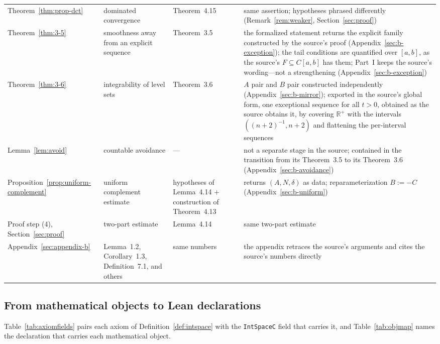 \documentclass[11pt]{article}
\theoremstyle{definition}
\theoremstyle{remark}
\begin{document}
\begin{table}[htbp]
\begin{tabular}{p{}p{}p{}p{}}
Theorem~\ref{thm:prop-dct} & dominated convergence & Theorem~4.15 & same assertion; hypotheses phrased differently (Remark~\ref{rem:weaker}, Section~\ref{sec:proof}) \\
Theorem~\ref{thm:3-5} & smoothness away from an explicit sequence & Theorem~3.5 & the formalized statement returns the explicit family constructed by the source's proof (Appendix~\ref{sec:b-exception}); the tail conditions are quantified over $[a,b]$, as the source's $F\subseteq C[a,b]$ has them; Part~I keeps the source's wording---not a strengthening (Appendix~\ref{sec:b-exception}) \\
Theorem~\ref{thm:3-6} & integrability of level sets & Theorem~3.6 & $A$ pair and $B$ pair constructed independently (Appendix~\ref{sec:b-mirror}); exported in the source's global form, one exceptional sequence for all $t>0$, obtained as the source obtains it, by covering $\mathbb{R}^{+}$ with the intervals $((n{+}2)^{-1},n{+}2)$ and flattening the per-interval sequences \\
Lemma~\ref{lem:avoid} & countable avoidance & --- & not a separate stage in the source; contained in the transition from its Theorem~3.5 to its Theorem~3.6 (Appendix~\ref{sec:b-avoidance}) \\
Proposition~\ref{prop:uniform-complement} & uniform complement estimate & hypotheses of Lemma~4.14 $+$ construction of Theorem~4.13 & returns $(A,N,\delta)$ as data; reparameterization $B:=-C$ (Appendix~\ref{sec:b-uniform}) \\
Proof step (4), Section~\ref{sec:proof} & two-part estimate & Lemma~4.14 & same two-part estimate \\
Appendix~\ref{sec:appendix-b} & Lemma~1.2, Corollary~1.3, Definition~7.1, and others & same numbers & the appendix retraces the source's arguments and cites the source's numbers directly \\
\hline
\end{tabular}
\end{table}

\subsection{From mathematical objects to Lean declarations}
\label{sec:objmap}
Table~\ref{tab:axiomfields} pairs each axiom of Definition~\ref{def:intspace} with the
\texttt{IntSpaceC} field that carries it, and Table~\ref{tab:objmap} names the declaration
that carries each mathematical object.
\end{document}
